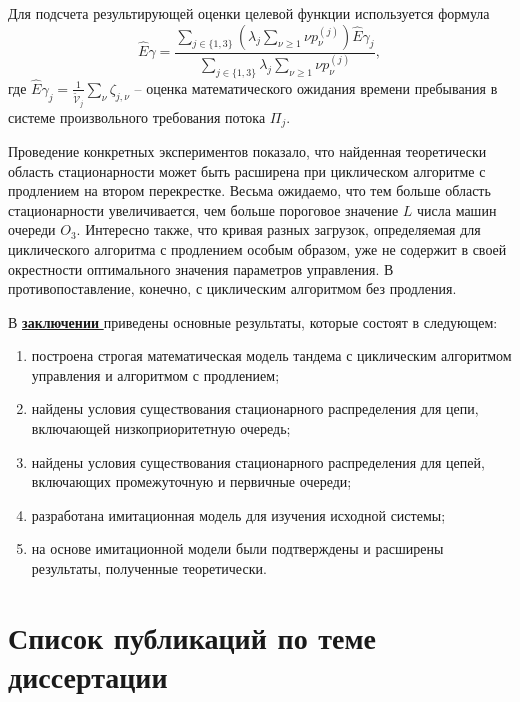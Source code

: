 \documentclass[14pt]{extarticle}
\newcommand\setItemnumber[1]{\setcounter{enumi}{\numexpr#1-1\relax}}
\theoremstyle{theorem}
\theoremstyle{remark}
\begin{document}
Для подсчета результирующей оценки целевой функции используется формула
\begin{equation}
 \hat{E}\gamma=\frac{\sum_{j\in\{1,3\}} (\lambda_j \sum_{\nu\geqslant1}\nu p_{\nu}^{(j)})\hat{E}\gamma_{j} }{\sum_{j\in\{1,3\}} \lambda_j \sum_{\nu\geqslant1}\nu p_{\nu}^{(j)}},
\end{equation}
где $\hat{E}\gamma_{j}=\frac{1}{\tilde{\mathcal{V}}_j}\sum_{\nu}\zeta_{j,\nu}$  -- оценка математического ожидания времени пребывания в системе произвольного требования потока $\Pi_j$.

Проведение конкретных экспериментов показало, что найденная теоретически область стационарности может быть расширена при циклическом алгоритме с продлением на втором перекрестке. Весьма ожидаемо, что тем больше область стационарности увеличивается, чем больше пороговое значение $L$ числа машин очереди $O_3$. Интересно также, что кривая разных загрузок, определяемая для циклического алгоритма с продлением особым образом, уже не содержит в своей окрестности оптимального значения параметров управления. В противопоставление, конечно, с циклическим алгоритмом без продления.


В \underline{\textbf{ заключении }} приведены основные результаты, которые состоят в следующем:
    \begin{enumerate}
        \item построена строгая математическая модель тандема с циклическим алгоритмом управления и алгоритмом с продлением;
        \item найдены условия существования стационарного распределения для цепи, включающей низкоприоритетную очередь;
        \item найдены условия существования стационарного распределения для цепей, включающих промежуточную и первичные очереди;
        \item разработана имитационная модель для изучения исходной системы;
        \item на основе имитационной модели были подтверждены и расширены результаты, полученные теоретически.
    \end{enumerate}

\section*{Список публикаций по теме диссертации}
\end{document}

